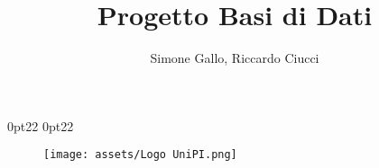 \documentclass{article}
\title{Progetto Basi di Dati}
\author{Simone Gallo, Riccardo Ciucci}
\date{ }                                %
\begin{document}
\titlespacing*{\subsection}             %
  {0pt}{2\baselineskip}{2\baselineskip}
\titlespacing*{\section}                %
  {0pt}{2\baselineskip}{2\baselineskip}
\begin{figure}
    \centering
    \texttt{[image: assets/Logo UniPI.png]}
    \label{fig:Logo Università di Pisa}
\end{figure}

\maketitle

\newpage

{ 
\renewcommand{\contentsname}{Indice}    %
\hypersetup{hidelinks}                  %
\tableofcontents                        %
}       

\newpage                                %
%
%
%
%
%
%
%
%
\end{document}
